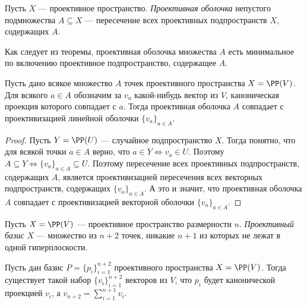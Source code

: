 \documentclass[12pt,a4paper]{article}
\begin{document}
    \begin{definition}
        Пусть $X$ --- проективное пространство. \emph{Проективная оболочка} непустого подмножества $A \subseteq X$ --- пересечение всех проективных подпространств $X$, содержащих $A$.
    \end{definition}

    \begin{remark}
        Как следует из теоремы, проективная оболочка множества $A$ есть минимальное по включению проективное подпространство, содержащее $A$.
    \end{remark}

    \begin{lemma}
        Пусть дано всякое множество $A$ точек проективного пространства $X = \PP(V)$. Для всякого $a \in A$ обозначим за $v_a$ какой-нибудь вектор из $V$, каноническая проекция которого совпадает с $a$. Тогда проективная оболочка $A$ совпадает с проективизацией линейной оболочки $\{v_a\}_{a \in A}$.
    \end{lemma}

    \begin{proof}
        Пусть $Y = \PP(U)$ --- случайное подпространство $X$. Тогда понятно, что для всякой точки $a \in A$ верно, что $a \in Y \Leftrightarrow v_a \in U$. Поэтому $A \subseteq Y \Leftrightarrow \{v_a\}_{a \in A} \subseteq U$. Поэтому пересечение всех проективных подпространств, содержащих $A$, является проективизацией пересечения всех векторных подпространств, содержащих $\{v_a\}_{a \in A}$. А это и значит, что проективная оболочка $A$ совпадает с проективизацией векторной оболочки $\{v_a\}_{a \in A}$.
    \end{proof}

    \begin{definition}
        Пусть $X = \PP(V)$ --- проективное пространство размерности $n$. \emph{Проективный базис} $X$ --- множество из $n+2$ точек, никакие $n+1$ из которых не лежат в одной гиперплоскости.
    \end{definition}

    \begin{lemma}
        Пусть дан базис $P = \{p_i\}_{i=1}^{n+2}$ проективного пространства $X = \PP(V)$. Тогда существует такой набор $\{v_i\}_{i=1}^{n+2}$ векторов из $V$, что $p_i$ будет канонической проекцией $v_i$, а $v_{n+2} = \sum_{i=1}^{n+1} v_i$.
    \end{lemma}
\end{document}
